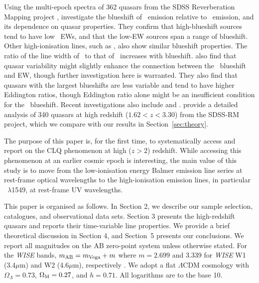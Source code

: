 \documentclass[fleqn,usenatbib]{mnras}
\begin{document}
Using the multi-epoch spectra of 362 quasars from the SDSS
Reverberation Mapping project \citep[SDSS-RM; ][]{Shen2015, Shen2019},
\citet{Sun2018} investigate the blueshift of \civ\ emission relative
to \mgii\ emission, and its dependence on quasar properties. They
confirm that high-blueshift sources tend to have low \civ\ EWs, and
that the low-EW sources span a range of blueshift. Other
high-ionisation lines, such as \heii, also show similar blueshift
properties. The ratio of the line width of \civ\ to that of \mgii\
increases with blueshift. \citet{Sun2018} also find that quasar
variability might slightly enhance the connection between the \civ\
blueshift and EW, though further investigation here is warranted. They
also find that quasars with the largest blueshifts are less variable
and tend to have higher Eddington ratios, though Eddington ratio alone
might be an insufficient condition for the \civ\ blueshift. Recent
investigations also include \citet{Meyer2019} and
\citet{Doan2019}. \citet{Dyer2019} provide a detailed analysis of 340
quasars at high redshift ($1.62<z<3.30$) from the SDSS-RM project,
which we compare with our results in Section~\ref{sec:theory}.

The purpose of this paper is, for the first time, to systematically
access and report on the CLQ phenomenon at high ($z>2$)
redshift. While accessing this phenomenon at an earlier cosmic epoch
is interesting, the main value of this study is to move from
the low-ionisation energy Balmer emission line series at rest-frame
optical wavelengths to the high-ionisation emission lines, in
particular \civ\ $\lambda$1549, at rest-frame UV wavelengths.

This paper is organised as follows. In Section 2, we describe our
sample selection, catalogues, and observational data sets.  Section 3
presents the high-redshift quasars and reports their time-variable
line properties.  We provide a brief theoretical discussion in Section
4, and Section~5 presents our conclusions.  We report all magnitudes
on the AB zero-point system \citep{Oke_Gunn1983, Fukugita1996} unless
otherwise stated. For the {\it WISE} bands, $m_{\rm AB} = m_{\rm Vega}
+ m$ where $m = 2.699$ and 3.339 for {\it WISE} W1 (3.4$\mu$m) and W2
(4.6$\mu$m), respectively \citep{Cutri2011, Cutri2013}. We adopt a
flat $\Lambda$CDM cosmology with $\Omega_{\Lambda} = 0.73 $,
$\Omega_{\rm M} = 0.27$, and $h = 0.71$. All logarithms are to the
base 10.


\end{document}
